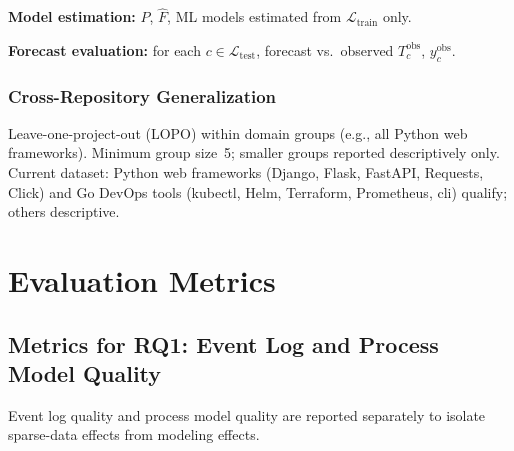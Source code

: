 \textbf{Model estimation:} $P$, $\hat{F}$, ML models estimated from
$\mathcal{L}_{\text{train}}$ only.

\textbf{Forecast evaluation:} for each $c \in \mathcal{L}_{\text{test}}$,
forecast vs.\ observed $T_c^{\text{obs}}$, $y_c^{\text{obs}}$.


\subsubsection{Cross-Repository Generalization}
\label{sec:cross-repo}

Leave-one-project-out (LOPO) within domain groups (e.g., all Python web
frameworks). Minimum group size~5; smaller groups reported descriptively
only. Current dataset: Python web frameworks
(Django, Flask, FastAPI, Requests, Click) and Go DevOps tools
(kubectl, Helm, Terraform, Prometheus, cli) qualify; others descriptive.


\section{Evaluation Metrics}
\label{sec:evaluation-metrics}

\subsection{Metrics for RQ1: Event Log and Process Model Quality}
\label{sec:metrics-rq1}

Event log quality and process model quality are reported separately to
isolate sparse-data effects from modeling effects.

